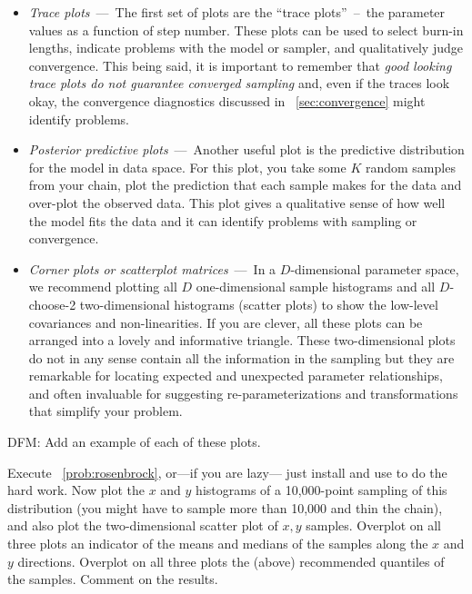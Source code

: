 \documentclass[modern]{aastex61}
\begin{document}
\begin{itemize}

\item \emph{Trace plots}~---~The first set of plots are the ``trace
plots''~--~the parameter values as a function of step number.
These plots can be used to select burn-in lengths, indicate problems with the
model or sampler, and qualitatively judge convergence.
This being said, it is important to remember that \emph{good looking trace
plots do not guarantee converged sampling} and, even if the traces look okay,
the convergence diagnostics discussed in \sectionname~\ref{sec:convergence}
might identify problems.

\item \emph{Posterior predictive plots}~---~Another useful plot is the
predictive distribution for the model in data space.
For this plot, you take some $K$ random samples from your chain, plot the
prediction that each sample makes for the data and over-plot the observed
data.
This plot gives a qualitative sense of how well the model fits the data and it
can identify problems with sampling or convergence.

\item \emph{Corner plots or scatterplot matrices}~---~In a $D$-dimensional
parameter space, we recommend plotting all $D$ one-dimensional sample
histograms and all $D$-choose-2 two-dimensional histograms (scatter plots) to
show the low-level covariances and non-linearities.
If you are clever, all these plots can be arranged into a lovely and
informative triangle. These two-dimensional plots
do not in any sense contain all the information in the sampling but they are
remarkable for locating expected and unexpected parameter relationships, and
often invaluable for suggesting re-parameterizations and transformations that
simplify your problem.

\end{itemize}

DFM: Add an example of each of these plots.

\begin{problem}\label{prob:rosenbrock2}
Execute \problemname~\ref{prob:rosenbrock}, or---if you are lazy---%
just install and use  to do the hard work.
Now plot the $x$ and $y$ histograms of a 10,000-point sampling of this
distribution (you might have to sample more than 10,000 and thin the
chain), and also plot the two-dimensional scatter plot of $x,y$
samples.
Overplot on all three plots an indicator of the means and medians of
the samples along the $x$ and $y$ directions.
Overplot on all three plots the (above) recommended quantiles of the
samples.
Comment on the results.
\end{problem}
\end{document}
